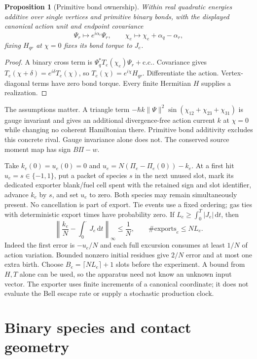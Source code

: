 \documentclass[11pt]{article}
\newtheorem{proposition}[theorem]{Proposition}
\theoremstyle{definition}\newtheorem{definition}[theorem]{Definition}
\theoremstyle{remark}\newtheorem{remark}[theorem]{Remark}
\newcommand{\dd}{\,\mathrm d}\newcommand{\Var}{\operatorname{Var}}
\begin{document}
\begin{proposition}[Primitive bond ownership]
Within real quadratic energies additive over single vertices and primitive binary bonds, with the displayed canonical action unit and endpoint covariance
\[
 \Psi_r\mapsto e^{i\alpha_r}\Psi_r,\qquad
 \chi_e\mapsto\chi_e+\alpha_q-\alpha_r,
\]
fixing $H_{qr}$ at $\chi=0$ fixes its bond torque to $J_e$.
\end{proposition}
\begin{proof}
A binary cross term is $\Psi_q^*T_e(\chi_e)\Psi_r+\mathrm{c.c.}$.
Covariance gives $T_e(\chi+\delta)=e^{i\delta}T_e(\chi)$, so $T_e(\chi)=e^{i\chi}H_{qr}$. Differentiate the action. Vertex-diagonal terms have zero bond torque. Every finite Hermitian $H$ supplies a realization.
\end{proof}
The assumptions matter. A triangle term $-\hbar k\|\Psi\|^2\sin(\chi_{12}+\chi_{23}+\chi_{31})$ is gauge invariant and gives an additional divergence-free action current $k$ at $\chi=0$ while changing no coherent Hamiltonian there. Primitive bond additivity excludes this concrete rival. Gauge invariance alone does not. The conserved source moment map has sign $B\Pi-w$.

Take $k_e(0)=u_e(0)=0$ and $u_e=N(\Pi_e-\Pi_e(0))-k_e$. At a first hit $u_e=s\in\{-1,1\}$, put a packet of species $s$ in the next unused slot, mark its dedicated exporter blank/fuel cell spent with the retained sign and slot identifier, advance $k_e$ by $s$, and set $u_e$ to zero. Both species may remain simultaneously present. No cancellation is part of export. Tie events use a fixed ordering; gas ties with deterministic export times have probability zero. If $L_e\ge\int_0^T|J_e|\dd t$, then
\begin{equation}
 \left\|\frac{k_e}{N}-\int_0^\cdot J_e\dd t\right\|_\infty\le\frac1N,
 \qquad \#\mathrm{exports}_e\le NL_e.
 \label{eq:export}
\end{equation}
Indeed the first error is $-u_e/N$ and each full excursion consumes at least $1/N$ of action variation. Bounded nonzero initial residues give $2/N$ error and at most one extra birth. Choose $B_e=\lceil NL_e\rceil+1$ slots before the experiment. A bound from $H,T$ alone can be used, so the apparatus need not know an unknown input vector. The exporter uses finite increments of a canonical coordinate; it does not evaluate the Bell escape rate or supply a stochastic production clock.

\section{Binary species and contact geometry}
\end{document}
